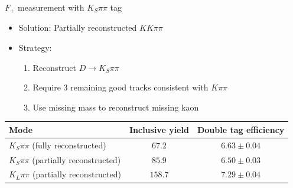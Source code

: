 \documentclass{beamer}
\begin{document}
\begin{frame}{$F_+$ measurement with $K_S\pi\pi$ tag}
  \begin{itemize}
    \item{Solution: Partially reconstructed $KK\pi\pi$}
    \item{Strategy:}
    \begin{enumerate}
      \item{Reconstruct $D\to K_S\pi\pi$}
      \item{Require 3 remaining good tracks consistent with $K\pi\pi$}
      \item{Use missing mass to reconstruct missing kaon}
    \end{enumerate}
  \end{itemize}
  \vspace{0.5cm}
  \def\arraystretch{1.2}%
  \begin{tabular}{l|c|c}
    Mode                                     & Inclusive yield & Double tag efficiency \\
    \hline
    $K_S\pi\pi$ (fully reconstructed)        & $67.2$          & $6.63 \pm 0.04$ \\
    $K_S\pi\pi$ (partially reconstructed)    & $85.9$          & $6.50 \pm 0.03$ \\
    $K_L\pi\pi$ (partially reconstructed)    & $158.7$         & $7.29 \pm 0.04$ \\
    \hline
  \end{tabular}
\end{frame}
\end{document}
